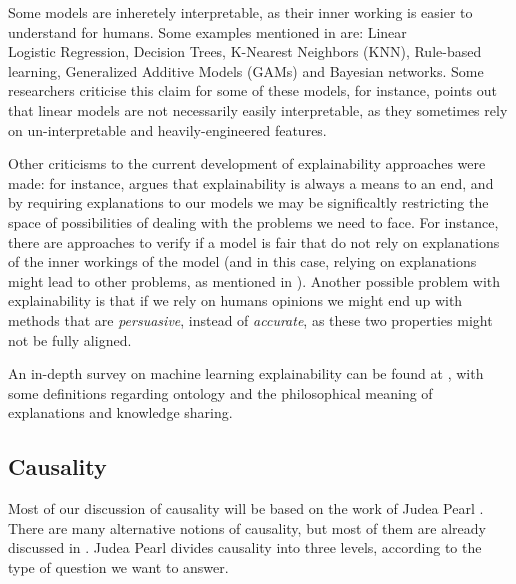 Some models are inheretely interpretable, as their inner working is easier to understand for humans. Some examples mentioned in \cite{Principles and Practice of Explainable Machine Learning} are: Linear\\Logistic Regression, Decision Trees, K-Nearest Neighbors (KNN), Rule-based learning, Generalized Additive Models (GAMs) and Bayesian networks. Some researchers criticise this claim for some of these models, for instance, \cite{The mythos of model interpretability: In machine learning, the concept of interpretability is both important and slippery} points out that linear models are not necessarily easily interpretable, as they sometimes rely on un-interpretable and heavily-engineered features.

Other criticisms to the current development of explainability approaches were made: for instance, \cite{Against Interpretability: a Critical Examination of the Interpretability Problem in Machine Learning} argues that explainability is always a means to an end, and by requiring explanations to our models we may be significaltly restricting the space of possibilities of dealing with the problems we need to face. For instance, there are approaches to verify if a model is fair that do not rely on explanations of the inner workings of the model (and in this case, relying on explanations might lead to other problems, as mentioned in \cite{How to explain and justify almost any decision}). Another possible problem with explainability is that if we rely on humans opinions we might end up with methods that are \textit{persuasive}, instead of \textit{accurate}, as these two properties might not be fully aligned. 

An in-depth survey on machine learning explainability can be found at \cite{A Survey on the Explainability of Supervised Machine Learning}, with some definitions regarding ontology and the philosophical meaning of explanations and knowledge sharing. 

\subsection{Causality}

Most of our discussion of causality will be based on the work of Judea Pearl \cite{Causality}. There are many alternative notions of causality, but most of them are already discussed in \cite{Causality}. Judea Pearl divides causality into three levels, according to the type of question we want to answer. 


